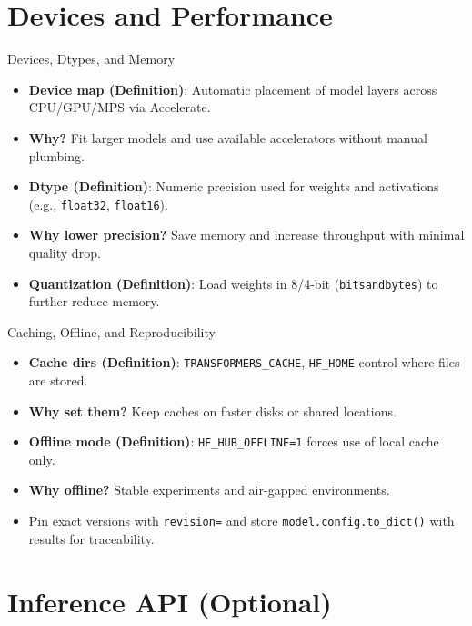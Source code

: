 \documentclass[aspectratio=169]{beamer}
\begin{document}
\section{Devices and Performance}

\begin{frame}[fragile]{Devices, Dtypes, and Memory}
  \begin{itemize}
    \item \textbf{Device map (Definition)}: Automatic placement of model layers across CPU/GPU/MPS via Accelerate.
    \item \textbf{Why?} Fit larger models and use available accelerators without manual plumbing.
    \item \textbf{Dtype (Definition)}: Numeric precision used for weights and activations (e.g., \texttt{float32}, \texttt{float16}).
    \item \textbf{Why lower precision?} Save memory and increase throughput with minimal quality drop.
    \item \textbf{Quantization (Definition)}: Load weights in 8/4-bit (\texttt{bitsandbytes}) to further reduce memory.
  \end{itemize}
\end{frame}

\begin{frame}{Caching, Offline, and Reproducibility}
  \begin{itemize}
    \item \textbf{Cache dirs (Definition)}: \texttt{TRANSFORMERS\_CACHE}, \texttt{HF\_HOME} control where files are stored.
    \item \textbf{Why set them?} Keep caches on faster disks or shared locations.
    \item \textbf{Offline mode (Definition)}: \texttt{HF\_HUB\_OFFLINE=1} forces use of local cache only.
    \item \textbf{Why offline?} Stable experiments and air-gapped environments.
    \item Pin exact versions with \texttt{revision=} and store \texttt{model.config.to\_dict()} with results for traceability.
  \end{itemize}
\end{frame}


\section{Inference API (Optional)}
\end{document}
